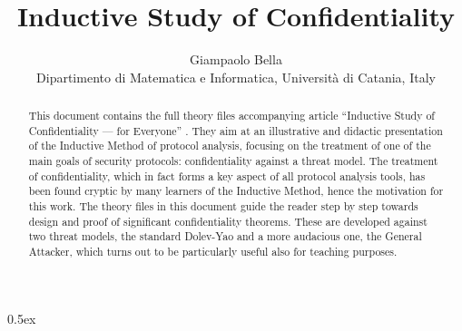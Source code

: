 \documentclass[11pt,a4paper]{article}
\begin{document}
\title{Inductive Study of Confidentiality}
\author{Giampaolo Bella\\
Dipartimento di Matematica e Informatica, Universit\`a di Catania, Italy}
\maketitle

\begin{abstract}
This document contains the full theory files accompanying article ``Inductive Study of Confidentiality --- for Everyone'' \cite{confeveryone}. They aim at an illustrative and didactic presentation of the Inductive Method of protocol analysis, focusing on the treatment of one of the main goals of security protocols: confidentiality against a threat model. The treatment of confidentiality, which in fact forms a key aspect of all protocol analysis tools, has been found cryptic by many learners of the Inductive Method, hence the motivation for this work. The theory files in this document guide the reader step by step towards design and proof of significant confidentiality theorems. These are developed against two threat models, the standard Dolev-Yao and a more audacious one, the General Attacker, which turns out to be particularly useful also for teaching purposes.
\end{abstract}

\tableofcontents

\parindent 0pt\parskip 0.5ex





\end{document}
